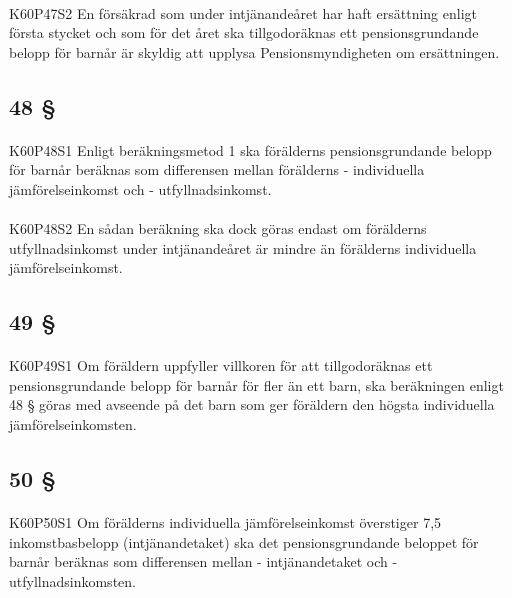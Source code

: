 \documentclass[a4paper,notitlepage,openany,10pt]{book}
\begin{document}
\paragraph*{}
{\tiny K60P47S2}
En försäkrad som under intjänandeåret har haft ersättning enligt första stycket och som för det året ska tillgodoräknas ett pensionsgrundande belopp för barnår är skyldig att upplysa Pensionsmyndigheten om ersättningen.
\subsection*{48 §}
\paragraph*{}
{\tiny K60P48S1}
Enligt beräkningsmetod 1 ska förälderns pensionsgrundande belopp för barnår beräknas som differensen mellan förälderns
\newline - individuella jämförelseinkomst och
\newline - utfyllnadsinkomst.
\paragraph*{}
{\tiny K60P48S2}
En sådan beräkning ska dock göras endast om förälderns utfyllnadsinkomst under intjänandeåret är mindre än förälderns individuella jämförelseinkomst.
\subsection*{49 §}
\paragraph*{}
{\tiny K60P49S1}
Om föräldern uppfyller villkoren för att tillgodoräknas ett pensionsgrundande belopp för barnår för fler än ett barn, ska beräkningen enligt 48 § göras med avseende på det barn som ger föräldern den högsta individuella jämförelseinkomsten.
\subsection*{50 §}
\paragraph*{}
{\tiny K60P50S1}
Om förälderns individuella jämförelseinkomst överstiger 7,5 inkomstbasbelopp (intjänandetaket) ska det pensionsgrundande beloppet för barnår beräknas som differensen mellan
\newline - intjänandetaket och
\newline - utfyllnadsinkomsten.
\end{document}
